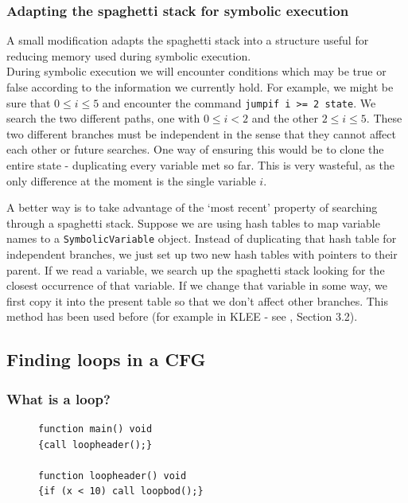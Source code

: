 \documentclass[12pt,a4paper]{article}
\begin{document}
\begin{enumerate}
\subsubsection{Adapting the spaghetti stack for symbolic execution}
A small modification adapts the spaghetti stack into a structure useful for reducing memory used during symbolic execution.\\
During symbolic execution we will encounter conditions which may be true or false according to the information we currently hold. For example, we might be sure that $0 \leq i \leq 5$ and encounter the command \texttt{jumpif i >= 2 state}. We search the two different paths, one with $0 \leq i < 2$ and the other $2 \leq i \leq 5$. These two different branches must be independent in the sense that they cannot affect each other or future searches. One way of ensuring this would be to clone the entire state - duplicating every variable met so far. This is very wasteful, as the only difference at the moment is the single variable $i$.\par

A better way is to take advantage of the `most recent' property of searching through a spaghetti stack. Suppose we are using hash tables to map variable names to a \texttt{SymbolicVariable} object. Instead of duplicating that hash table for independent branches, we just set up two new hash tables with pointers to their parent. If we read a variable, we search up the spaghetti stack looking for the closest occurrence of that variable. If we change that variable in some way, we first copy it into the present table so that we don't affect other branches. This method has been used before (for example in KLEE - see \cite{klee}, Section 3.2).

\subsection{Finding loops in a CFG} \label{app:loops}
\subsubsection{What is a loop?}
\begin{figure}\label{fig:loops}
\begin{minipage}{.45\textwidth}
\begin{lstlisting}[caption=A loop.,frame=tlrb, language=myLang, label={isloop}]
function main() void 
{call loopheader();}

function loopheader() void
{if (x < 10) call loopbod();}


\end{lstlisting}
\end{minipage}
\end{figure}
\end{enumerate}
\end{document}
